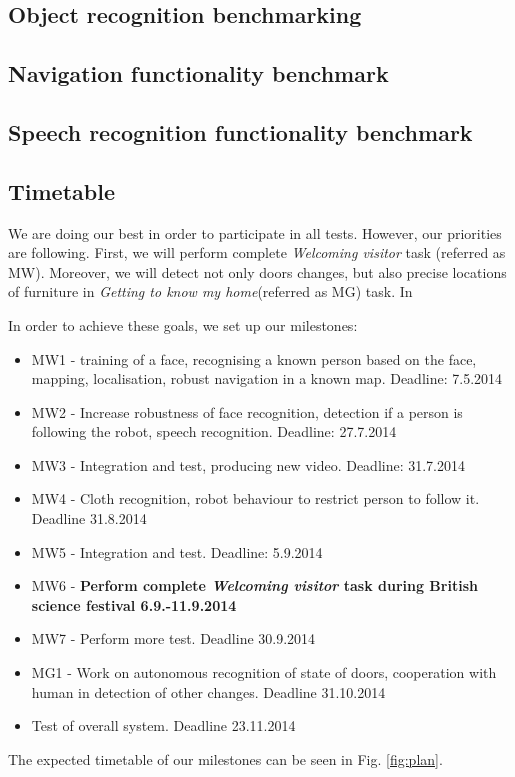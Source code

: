 \subsection{Object recognition benchmarking} %

\subsection{Navigation functionality benchmark}

\subsection{Speech recognition functionality benchmark}

\subsection{Timetable}

We are doing our best in order to participate in all tests. However, our priorities are following.
First, we will perform complete \textit{Welcoming visitor} task (referred as MW). 
Moreover, we will detect not only doors changes, but also precise locations of furniture in \textit{Getting to know my home}(referred as MG) task. 
In \textit{}

 In order to achieve these goals, we set up our milestones:
\begin{itemize}
\item MW1 - training of a face, recognising a known person based on the face, mapping, localisation, robust navigation in a known map. Deadline: 7.5.2014
\item MW2 - Increase robustness of face recognition, detection if a person is following the robot, speech recognition. Deadline: 27.7.2014
\item MW3 - Integration and test, producing new video. Deadline: 31.7.2014
\item MW4 - Cloth recognition, robot behaviour to restrict person to follow it. Deadline 31.8.2014
\item MW5 - Integration and test. Deadline: 5.9.2014
\item MW6 - \textbf{Perform complete \textit{Welcoming visitor} task during British science festival 6.9.-11.9.2014}
\item MW7 - Perform more test. Deadline 30.9.2014
\item MG1 - Work on autonomous recognition of state of doors, cooperation with human in detection of other changes. Deadline 31.10.2014
\item Test of overall system. Deadline 23.11.2014
\end{itemize}
The expected timetable of our milestones can be seen in Fig. \ref{fig:plan}.

